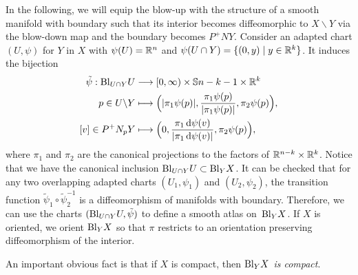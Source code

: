\documentclass[\MainFolder/Text.tex]{subfiles}
\begin{document}
In the following, we will equip the blow-up with the structure of a smooth manifold with boundary such that its interior becomes diffeomorphic to $X\backslash Y$ via the blow-down map and the boundary becomes $P^+ NY$.
Consider an adapted chart $(U,\psi)$ for $Y$ in $X$ with $\psi(U)=\mathbb{R}^{n}$ and $\psi(U\cap Y)=\{(0,y)\mid y\in \mathbb{R}^k \}$.
It induces the bijection
\begin{align*}
 \tilde{\psi}: \mathrm{Bl}_{U\cap Y}U &\longrightarrow [0,\infty) \times \mathbb{S}{n-k-1} \times \mathbb{R}^k \\
  p\in U\backslash Y &\longmapsto \Bigl (|\pi_1 \psi(p)|, \frac{\pi_1\psi(p)}{|\pi_1\psi(p)|},\pi_2 \psi(p) \Bigr), \\
  [v]\in P^+N_p Y & \longmapsto \Bigl(0,\frac{\pi_1 \operatorname{d\psi}(v)}{|\pi_1 \operatorname{d\psi} (v)|},\pi_2\psi(p)\Bigr),
\end{align*}
where $\pi_1$ and $\pi_2$ are the canonical projections to the factors of $\mathbb{R}^{n-k} \times \mathbb{R}^k$.
Notice that we have the canonical inclusion $\mathrm{Bl}_{U\cap Y} U \subset \mathrm{Bl}_Y X$.
It can be checked that for any two overlapping adapted charts $(U_1,\psi_1)$ and $(U_2,\psi_2)$, the transition function $\tilde{\psi}_1\circ \tilde{\psi}_2^{-1}$ is a diffeomorphism of manifolds with boundary.
Therefore, we can use the charts $(\mathrm{Bl}_{U\cap Y}U, \tilde{\psi})$ to define a smooth atlas on~$\mathrm{Bl}_Y X$.
If $X$ is oriented, we orient $\mathrm{Bl}_Y X$ so that $\pi$ restricts to an orientation preserving diffeomorphism of the interior.

An important obvious fact is that if $X$ is compact, then \emph{$\mathrm{Bl}_Y X$ is compact}.
\end{document}
